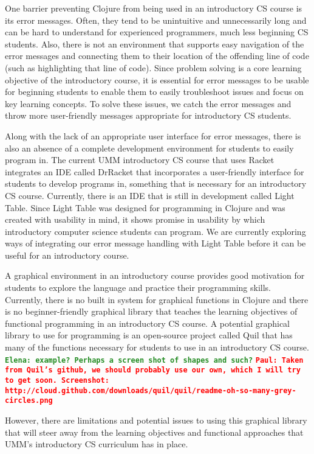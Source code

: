 \documentclass[12pt]{article}
\newcommand{\comment}[1]{{\bf \tt  {#1}}}
\newcommand{\emcomment}[1]{\textcolor{ForestGreen}{\comment{Elena: {#1}}}}
\newcommand{\pscomment}[1]{\textcolor{red}{\comment{Paul: {#1}}}}
\begin{document}
One barrier preventing Clojure from being used in an introductory CS course is its error messages. Often, they tend to be unintuitive and unnecessarily long and can be hard to understand for experienced programmers, much less beginning CS students. Also, there is not an environment that supports easy navigation of the error messages and connecting them to their location of the offending line of code (such as highlighting that line of code). Since problem solving is a core learning objective of the introductory course, it is essential for error messages to be usable for beginning students to enable them to easily troubleshoot issues and focus on key learning concepts. To solve these issues, we catch the error messages and throw more user-friendly messages appropriate for introductory CS students. 

Along with the lack of an appropriate user interface for error messages, there is also an absence of a complete development environment for students to easily program in. The current UMM introductory CS course that uses Racket integrates an IDE called DrRacket that incorporates a user-friendly interface for students to develop programs in, something that is necessary for an introductory CS course.  Currently, there is an IDE that is still in development called Light Table.  Since Light Table was designed for programming in Clojure and was created with usability in mind, it shows promise in usability by which introductory computer science students can program. We are currently exploring ways of integrating our error message handling with Light Table before it can be useful for an introductory course. 

A graphical environment in an introductory course provides good motivation for students to explore the language and practice their programming skills. Currently, there is no built in system for graphical functions in Clojure and there is no beginner-friendly graphical library that teaches the learning objectives of functional programming in an introductory CS course. A potential graphical library to use for programming is an open-source project called Quil that has many of the functions necessary for students to use in an introductory CS course.
\emcomment{example? Perhaps a screen shot of shapes and such?}
\pscomment{Taken from Quil's github, we should probably use our own, which I will try to get soon.  Screenshot: http://cloud.github.com/downloads/quil/quil/readme-oh-so-many-grey-circles.png}

However, there are limitations and potential issues to using this graphical library that will steer away from the learning objectives and functional approaches that UMM’s introductory CS curriculum has in place.
\end{document}
